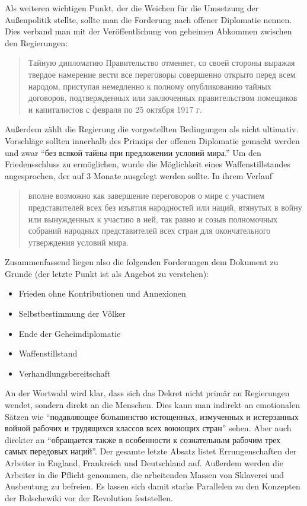 \documentclass[12pt,headsepline,a4paper]{scrartcl}
\newcommand\textcyr[1]{{\fontencoding{OT2}\fontfamily{wncyr}\selectfont #1}}
\begin{document}
Als weiteren wichtigen Punkt, der die Weichen für die Umsetzung der Außenpolitik stellte, sollte man die Forderung nach offener Diplomatie nennen. Dies verband man mit der Veröffentlichung von geheimen Abkommen zwischen den Regierungen:
\begin{quotation}

\textcyr{
Тайную дипломатию  Правительство отменяет,  со своей стороны
выражая твердое намерение вести все переговоры совершенно открыто
перед всем народом,  приступая немедленно к полному опубликованию
тайных договоров,  подтвержденных или заключенных  правительством
помещиков  и  капиталистов  с  февраля по 25 октября 1917 г.
}\autocite[15]{dekret}
\end{quotation}


Außerdem zählt die Regierung die vorgestellten Bedingungen als nicht ultimativ. Vorschläge sollten innerhalb des Prinzips der offenen Diplomatie gemacht werden und zwar "`\textcyr{без всякой  тайны  при  предложении  условий
мира.}"'\autocite[15]{dekret}
Um den Friedensschluss zu ermöglichen, wurde die Möglichkeit eines Waffenstillstandes angesprochen, der auf 3 Monate ausgelegt werden sollte. In ihrem Verlauf
\begin{quotation}
\textcyr{
вполне  возможно  как  завершение  переговоров о мире с
участием представителей всех без изъятия народностей  или  наций,
втянутых  в  войну  или вынужденных к участию в ней,  так равно и
созыв полномочных собраний народных представителей всех стран для
окончательного утверждения условий мира.}\autocite[15]{dekret}
\end{quotation}

Zusammenfassend liegen also die folgenden Forderungen dem Dokument zu Grunde (der letzte Punkt ist als Angebot zu verstehen):
\begin{itemize}
  \item Frieden ohne Kontributionen und Annexionen
  \item Selbstbestimmung der Völker
  \item Ende der Geheimdiplomatie
  \item Waffenstillstand
  \item Verhandlungsbereitschaft
\end{itemize}

An der Wortwahl wird klar, dass sich das Dekret nicht primär an Regierungen wendet, sondern direkt an die Menschen. Dies kann man indirekt an emotionalen Sätzen wie "`\textcyr{подавляющее  большинство  истощенных,  измученных  и  истерзанных войной рабочих и трудящихся классов всех воюющих стран}"' sehen. Aber auch direkter an "`\textcyr{обращается   также   в   особенности   к
сознательным рабочим трех самых передовых  наций}"'\autocite[16]{dekret}. Der gesamte letzte Absatz listet Errungenschaften der Arbeiter in England, Frankreich und Deutschland auf. Außerdem werden die Arbeiter in die Pflicht genommen, die arbeitenden Massen von Sklaverei und Ausbeutung zu befreien.
Es lassen sich damit starke Parallelen zu den Konzepten der Bolschewiki vor der Revolution feststellen.
\end{document}
